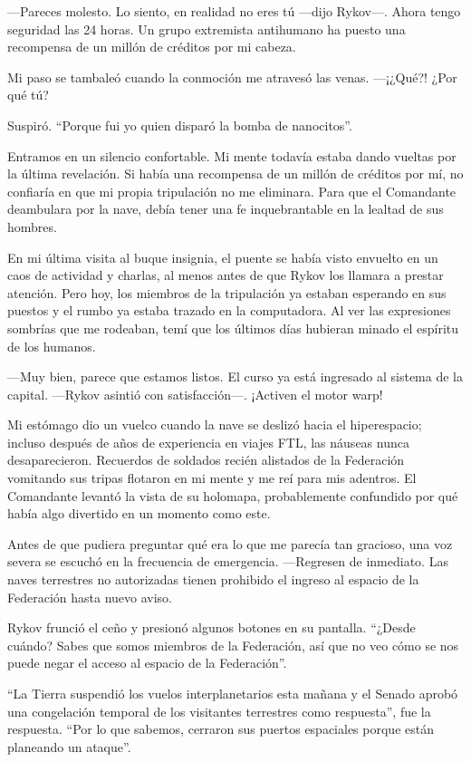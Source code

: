 —Pareces molesto. Lo siento, en realidad no eres tú —dijo Rykov—. Ahora tengo seguridad las 24 horas. Un grupo extremista antihumano ha puesto una recompensa de un millón de créditos por mi cabeza.

Mi paso se tambaleó cuando la conmoción me atravesó las venas. —¡¿Qué?! ¿Por qué tú?

Suspiró. ``Porque fui yo quien disparó la bomba de nanocitos''.

Entramos en un silencio confortable. Mi mente todavía estaba dando vueltas por la última revelación. Si había una recompensa de un millón de créditos por mí, no confiaría en que mi propia tripulación no me eliminara. Para que el Comandante deambulara por la nave, debía tener una fe inquebrantable en la lealtad de sus hombres.

En mi última visita al buque insignia, el puente se había visto envuelto en un caos de actividad y charlas, al menos antes de que Rykov los llamara a prestar atención. Pero hoy, los miembros de la tripulación ya estaban esperando en sus puestos y el rumbo ya estaba trazado en la computadora. Al ver las expresiones sombrías que me rodeaban, temí que los últimos días hubieran minado el espíritu de los humanos.

—Muy bien, parece que estamos listos. El curso ya está ingresado al sistema de la capital. —Rykov asintió con satisfacción—. ¡Activen el motor warp!

Mi estómago dio un vuelco cuando la nave se deslizó hacia el hiperespacio; incluso después de años de experiencia en viajes FTL, las náuseas nunca desaparecieron. Recuerdos de soldados recién alistados de la Federación vomitando sus tripas flotaron en mi mente y me reí para mis adentros. El Comandante levantó la vista de su holomapa, probablemente confundido por qué había algo divertido en un momento como este.

Antes de que pudiera preguntar qué era lo que me parecía tan gracioso, una voz severa se escuchó en la frecuencia de emergencia. —Regresen de inmediato. Las naves terrestres no autorizadas tienen prohibido el ingreso al espacio de la Federación hasta nuevo aviso.

Rykov frunció el ceño y presionó algunos botones en su pantalla. ``¿Desde cuándo? Sabes que somos miembros de la Federación, así que no veo cómo se nos puede negar el acceso al espacio de la Federación''.

``La Tierra suspendió los vuelos interplanetarios esta mañana y el Senado aprobó una congelación temporal de los visitantes terrestres como respuesta'', fue la respuesta. ``Por lo que sabemos, cerraron sus puertos espaciales porque están planeando un ataque''.

